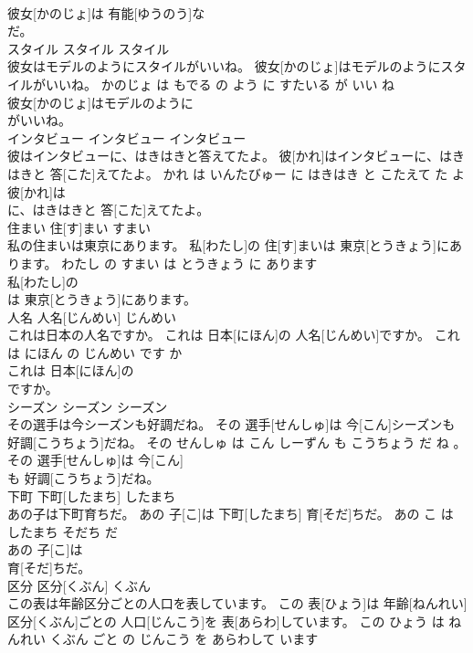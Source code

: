 \documentclass[8pt]{extreport}
\begin{document}
\begin{CJK}{UTF8}{min}
\\	彼女[かのじょ]は 有能[ゆうのう]な
\\	だ。			
\\	スタイル	スタイル	スタイル	
\\	彼女はモデルのようにスタイルがいいね。	彼女[かのじょ]はモデルのようにスタイルがいいね。	かのじょ は もでる の よう に すたいる が いい ね	
\\	彼女[かのじょ]はモデルのように
\\	がいいね。			
\\	インタビュー	インタビュー	インタビュー	
\\	彼はインタビューに、はきはきと答えてたよ。	彼[かれ]はインタビューに、はきはきと 答[こた]えてたよ。	かれ は いんたびゅー に はきはき と こたえて た よ	
\\	彼[かれ]は
\\	に、はきはきと 答[こた]えてたよ。			
\\	住まい	住[す]まい	すまい	
\\	私の住まいは東京にあります。	私[わたし]の 住[す]まいは 東京[とうきょう]にあります。	わたし の すまい は とうきょう に あります	
\\	私[わたし]の
\\	は 東京[とうきょう]にあります。			
\\	人名	人名[じんめい]	じんめい	
\\	これは日本の人名ですか。	これは 日本[にほん]の 人名[じんめい]ですか。	これ は にほん の じんめい です か	
\\	これは 日本[にほん]の
\\	ですか。			
\\	シーズン	シーズン	シーズン	
\\	その選手は今シーズンも好調だね。	その 選手[せんしゅ]は 今[こん]シーズンも 好調[こうちょう]だね。	その せんしゅ は こん しーずん も こうちょう だ ね 。	
\\	その 選手[せんしゅ]は 今[こん]
\\	も 好調[こうちょう]だね。			
\\	下町	下町[したまち]	したまち	
\\	あの子は下町育ちだ。	あの 子[こ]は 下町[したまち] 育[そだ]ちだ。	あの こ は したまち そだち だ	
\\	あの 子[こ]は
\\	育[そだ]ちだ。			
\\	区分	区分[くぶん]	くぶん	
\\	この表は年齢区分ごとの人口を表しています。	この 表[ひょう]は 年齢[ねんれい] 区分[くぶん]ごとの 人口[じんこう]を 表[あらわ]しています。	この ひょう は ねんれい くぶん ごと の じんこう を あらわして います	

\end{CJK}
\end{document}
